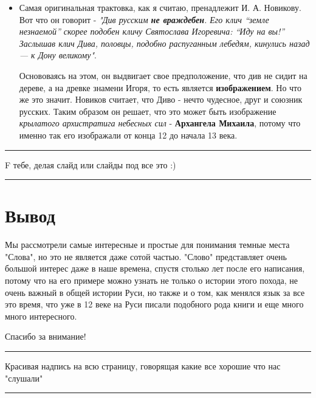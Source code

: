 \documentclass[14pt, a4paper]{article}
\newcommand{\descr}[1]
{\par\noindent\rule{0.5\textwidth}{0.4pt} \par {\large #1} \par\noindent\rule{0.5\textwidth}{0.4pt}}
\begin{document}
{\begin{itemize}
  \item Самая оригинальная трактовка, как я считаю, пренадлежит И. А. Новикову. Вот что он говорит - {\itshape "Див русским {\bfseries не враждебен}. Его клич “земле незнаемой” скорее подобен кличу Святослава Игоре­вича: “Иду на вы!” Заслышав клич Дива, половцы, подобно распуганным лебедям, кинулись назад — к Дону великому"}. 
    \par Основоваясь на этом, он выдвигает свое предположение, что див не сидит на дереве, а на древке знамени Игоря, то есть является {\bfseries изображением}. Но что же это значит. Новиков считает, что Диво - нечто чудесное, друг и союзник русских. Таким образом он решает, что это может быть изображение {\itshape крылатого архистратига небесных сил} - {\bfseries Архангела Михаила}, потому что именно так его изображали от конца 12 до начала 13 века.
\end{itemize}
\descr{F тебе, делая слайд или слайды под все это :)}

\section{Вывод}
Мы рассмотрели самые интересные и простые для понимания темные места "Слова", но это не является даже сотой частью. "Слово" представляет очень большой интерес даже в наше времена, спустя столько лет после его написания, потому что на его примере можно узнать не только о истории этого похода, не очень важный в общей истории Руси, но также и о том, как менялся язык за все это время, что уже в 12 веке на Руси писали подобного рода книги и еще много много интересного.
\par Спасибо за внимание!
\descr{Красивая надпись на всю страницу, говорящая какие все хорошие что нас "слушали"}



}
\end{document}
